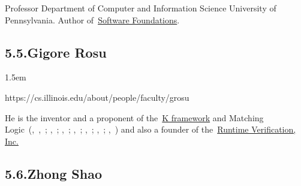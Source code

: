 \documentclass[12pt,twoside]{article}
\begin{document}
\noindent{}Professor Department of Computer and Information Science University of Pennsylvania.
Author of~\href{http://www.cis.upenn.edu/~bcpierce/sf}{Software Foundations}.%

\subsection{5.5.\hspace*{0.5em}Gigore Rosu}%

\begin{mddefinitions}%


\begin{mdbmarginx}{}{}{}{1.5em}%
\begin{mddefdata}%
https://cs.illinois.edu/about/people/faculty/grosu%
\end{mddefdata}%
\end{mdbmarginx}%
\end{mddefinitions}%

\noindent{}He is the inventor and a proponent of the~\href{https://kframework.org/}{K
framework} and Matching
Logic~(,~,~; ,~; ,~; ,~; ,~; ,~; ,~) and also a founder of the~\href{https://runtimeverification.com/}{Runtime
Verification, Inc.}

\subsection{5.6.\hspace*{0.5em}Zhong Shao}%
\end{document}
